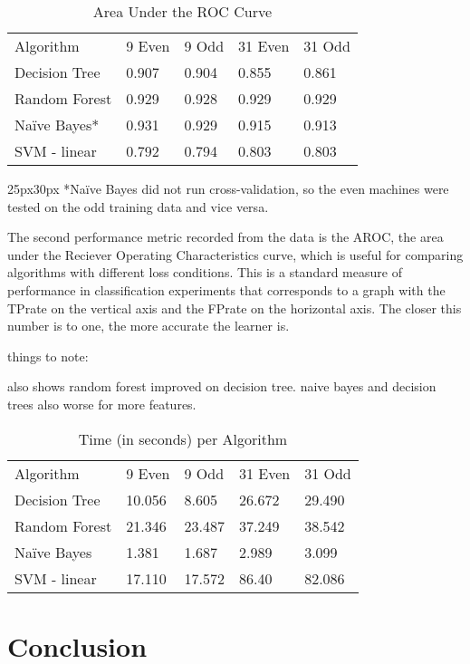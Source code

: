 \documentclass[aps, reprint, amsmath, amssymb]{revtex4-1}
\begin{document}
\begin{table}[H]
  \begin{center}
    \caption{Area Under the ROC Curve} \label{tab:title} 
    \begin{tabular}{ | l || l | l | l | l |}
      \hline
      Algorithm & 9 Even & 9 Odd & 31 Even & 31 Odd \\ \hhline{|=||=|=|=|=|}
      Decision Tree & 0.907 & 0.904 & 0.855 & 0.861 \\ \hline
      Random Forest & 0.929 & 0.928  & 0.929  & 0.929 \\ \hline
      Na{\"i}ve Bayes* & 0.931  & 0.929 & 0.915 & 0.913 \\ \hline
      SVM - linear & 0.792 & 0.794 & 0.803 & 0.803 \\ \hline
    \end{tabular}
  \end{center}
  \begin{changemargin}{25px}{30px}
  \footnotesize{
  *Na{\"i}ve Bayes did not run cross-validation, so the even machines were tested on the odd training data and vice versa.}
  \end{changemargin}
\end{table}

The second performance metric recorded from the data is the AROC, the area under the Reciever Operating Characteristics curve, which is useful for comparing algorithms with different loss conditions. This is a standard measure of performance in classification experiments that corresponds to a graph with the TPrate on the vertical axis and the FPrate on the horizontal axis. The closer this number is to one, the more accurate the learner is.

things to note:

also shows random forest improved on decision tree.  
naive bayes and decision trees also worse for more features.

\begin{table}[H]
  \begin{center}
    \caption{Time (in seconds) per Algorithm} \label{tab:title} 
    \begin{tabular}{ | l || l | l | l | l |}  
      \hline
      Algorithm & 9 Even & 9 Odd & 31 Even & 31 Odd \\ \hhline{|=||=|=|=|=|}
      Decision Tree & 10.056 & 8.605 & 26.672 & 29.490 \\ \hline
      Random Forest & 21.346 & 23.487 & 37.249 & 38.542 \\ \hline
      Na{\"i}ve Bayes & 1.381 & 1.687 & 2.989 & 3.099 \\ \hline
      SVM - linear & 17.110 & 17.572 & 86.40 & 82.086 \\ \hline
    \end{tabular}
  \end{center}
\end{table}



\section{Conclusion}
\end{document}

